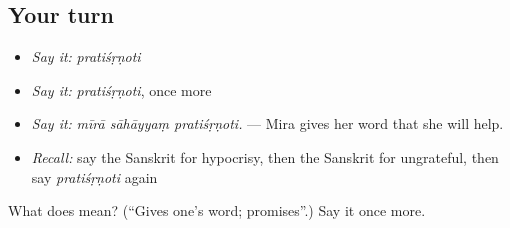 \subsection*{Your turn}
\begin{itemize}
\raggedright
  \item \emph{Say it:} \emph{pratiśṛṇoti}
  \item \emph{Say it:} \emph{pratiśṛṇoti}, once more
  \item \emph{Say it:} \emph{mīrā sāhāyyaṃ pratiśṛṇoti.} — Mira gives her word that she will help.
  \item \emph{Recall:} say the Sanskrit for hypocrisy, then the Sanskrit for ungrateful, then say \emph{pratiśṛṇoti} again
\end{itemize}

\begin{tcolorbox}[breakable,colback=teal!4,colframe=teal!35!black,title={Before you move on}]
What does  mean? (\textquotedblleft{}Gives one's word; promises\textquotedblright{}.) Say it once more.
\end{tcolorbox}
